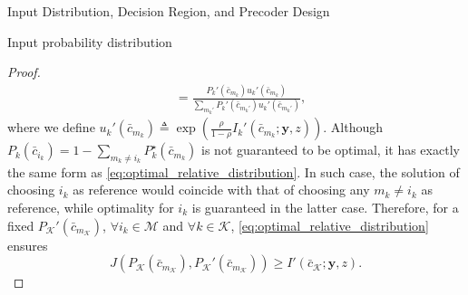 \documentclass[journal]{IEEEtran}
\begin{document}
\begin{section}{Input Distribution, Decision Region, and Precoder Design}
\begin{subsection}{Input probability distribution}
\begin{proof}
\begin{subequations}
\begin{align}
						& = \frac{P_k'(\bar{c}_{m_k}) u_k'(\bar{c}_{m_k})}{\sum_{m_k'} P_k'(\bar{c}_{m_k'}) u_k'(\bar{c}_{m_k'})},
						\label{eq:optimal_relative_distribution}
					\end{align}
				\end{subequations}
				where we define $u_k'(\bar{c}_{m_k}) \triangleq \exp \left( \frac{\rho}{1 - \rho} I_k'(\bar{c}_{m_k};\boldsymbol{y},z) \right)$. Although $P_k(\bar{c}_{i_k}) = 1 - \sum_{m_k \ne i_k} P_k^\star(\bar{c}_{m_k})$ is not guaranteed to be optimal, it has exactly the same form as \eqref{eq:optimal_relative_distribution}. In such case, the solution of choosing $i_k$ as reference would coincide with that of choosing any $m_k \ne i_k$ as reference, while optimality for $i_k$ is guaranteed in the latter case. Therefore, for a fixed $P_{\mathcal{K}}'(\bar{c}_{m_{\mathcal{K}}})$, $\forall i_k \in \mathcal{M}$ and $\forall k \in \mathcal{K}$, \eqref{eq:optimal_relative_distribution} ensures
				\begin{equation}
					J \left( P_{\mathcal{K}}(\bar{c}_{m_{\mathcal{K}}}),P_{\mathcal{K}}'(\bar{c}_{m_{\mathcal{K}}}) \right) \ge I'(\bar{c}_{\mathcal{K}};\boldsymbol{y},z).
					\label{eq:information_difference_lower}
				\end{equation}


\end{proof}
\end{subsection}
\end{section}
\end{document}

